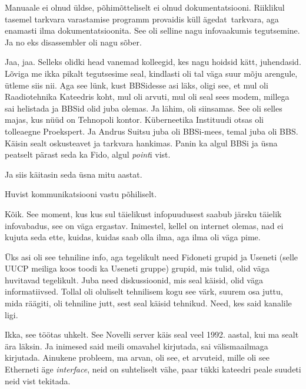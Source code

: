 Manuaale ei olnud üldse, põhimõtteliselt ei olnud dokumentatsiooni. Riiklikul 
tasemel tarkvara varastamise programm provaidis küll ägedat tarkvara, aga 
enamasti ilma dokumentatsioonita. See oli selline nagu  infovaakumis 
tegutsemine. Ja no eks disassembler oli nagu sõber.


Jaa, jaa. Selleks olidki head vanemad kolleegid, kes nagu hoidsid kätt, 
juhendasid. Lõviga me ikka pikalt tegutsesime seal, kindlasti 
oli tal väga suur mõju arengule, ütleme siis nii. Aga see lünk,  kust BBSidesse 
asi läks,  oligi see, et mul oli Raadiotehnika Kateedris koht, mul oli 
arvuti, mul oli seal sees modem, millega sai helistada ja BBSid olid juba 
olemas. Ja lähim, oli siinsamas. See oli selles majas, kus nüüd on 
Tehnopoli kontor. Küberneetika Instituudi otsas oli tolleaegne 
Proekspert. Ja Andrus Suitsu juba 
oli BBSi-mees, temal juba oli BBS. Käisin sealt oskusteavet ja tarkvara 
hankimas. Panin ka algul BBSi ja üsna peatselt pärast seda ka Fido, algul 
\emph{point}i vist.

Ja siis käitasin seda üsna mitu aastat. 


Huvist kommunikatsiooni vastu põhiliselt.


Kõik. See moment, kus kus sul täielikust infopuudusest saabub järsku täielik 
infovabadus, see on väga ergastav. Inimestel, kellel on internet olemas, nad ei 
kujuta seda ette, kuidas, kuidas saab olla ilma, aga ilma oli väga pime.

Üks asi oli see tehniline info, aga tegelikult need Fidoneti grupid ja Useneti 
(selle UUCP meiliga koos toodi ka Useneti gruppe) grupid, mis tulid, olid väga 
huvitavad tegelikult. Juba need diskussioonid, mis seal käisid, olid väga 
informatiivsed. Tollal oli oluliselt tehnilisem kogu see värk, suurem osa 
juttu, mida räägiti, oli tehniline jutt, sest seal käisid tehnikud. Need, kes 
said kanalile ligi.


Ikka, see töötas uhkelt. See Novelli server käis seal veel 1992. aastal, kui ma 
sealt ära läksin. Ja inimesed said meili omavahel kirjutada, sai välismaailmaga 
kirjutada. Ainukene probleem, ma arvan, oli see, et arvuteid, mille oli see 
Etherneti äge \emph{interface}, neid on suhteliselt vähe, paar tükki kateedri 
peale suudeti neid vist tekitada.

